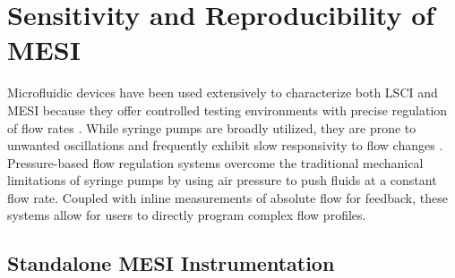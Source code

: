\section{Sensitivity and Reproducibility of MESI}

Microfluidic devices have been used extensively to characterize both LSCI and MESI because they offer controlled testing environments with precise regulation of flow rates \cite{Parthasarathy:2008el, Richards:2013bi, Kazmi:2015du}. While syringe pumps are broadly utilized, they are prone to unwanted oscillations and frequently exhibit slow responsivity to flow changes \cite{Korczyk:2010eu, Zhou:2011ey, Li:2014ca}. Pressure-based flow regulation systems overcome the traditional mechanical limitations of syringe pumps by using air pressure to push fluids at a constant flow rate. Coupled with inline measurements of absolute flow for feedback, these systems allow for users to directly program complex flow profiles.

\subsection{Standalone MESI Instrumentation}


